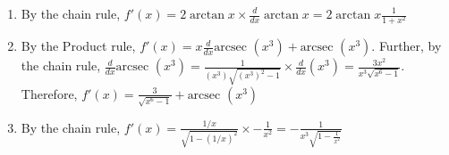 \begin{Answer}[ref=invtrig1]
\begin{enumerate}
\item By the chain rule, $f'(x) = 2\arctan{x} \times \frac{d}{dx}\arctan{x} = 2\arctan{x}\frac{1}{1 + x^2}$
\item By the Product rule, $f'(x) = x \frac{d}{dx}\text{arcsec }(x^3) + \text{arcsec }(x^3)$. Further, by the chain rule, $\frac{d}{dx}\text{arcsec }(x^3) = \frac{1}{(x^3)\sqrt{(x^3)^2-1}} \times \frac{d}{dx}(x^3) = \frac{3x^2}{x^3\sqrt{x^6-1}}$. Therefore, $f'(x) = \frac{3}{\sqrt{x^6-1}} + \text{arcsec }(x^3)$
\item By the chain rule, $f'(x) = \frac{1/x}{\sqrt{1-(1/x)^2}} \times - \frac{1}{x^2} = - \frac{1}{x^3\sqrt{1-\frac{1}{x^2}}}$
\end{enumerate}
\end{Answer}